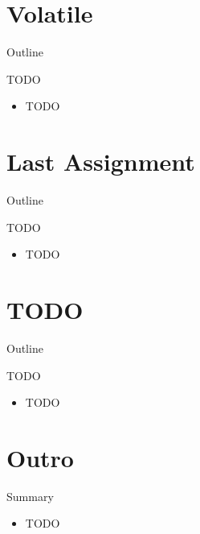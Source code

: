\section{Volatile}

\begin{frame}{Outline}
  \tableofcontents[current]
\end{frame}

\begin{frame}{TODO}
  \begin{itemize}
  \item TODO
  \end{itemize}
\end{frame}


\section{Last Assignment}

\begin{frame}{Outline}
  \tableofcontents[current]
\end{frame}

\begin{frame}{TODO}
  \begin{itemize}
  \item TODO
  \end{itemize}
\end{frame}


\section{TODO}

\begin{frame}{Outline}
  \tableofcontents[current]
\end{frame}

\begin{frame}{TODO}
  \begin{itemize}
  \item TODO
  \end{itemize}
\end{frame}


\section*{Outro}

\begin{frame}{Summary}
  \begin{itemize}
  \item TODO
  \end{itemize}
\end{frame}


